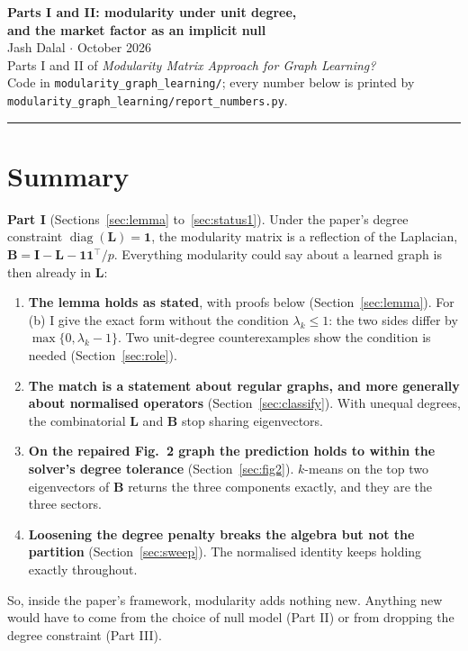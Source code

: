 \documentclass[11pt,a4paper]{article}
\newcommand{\Lap}{\mathbf{L}}
\newcommand{\Bmat}{\mathbf{B}}
\newcommand{\Imat}{\mathbf{I}}
\newcommand{\one}{\mathbf{1}}
\theoremstyle{remark}
\begin{document}
\begin{center}
{\Large\textbf{Parts I and II: modularity under unit degree,}}\\[1mm]
{\Large\textbf{and the market factor as an implicit null}}\\[2mm]
{\normalsize Jash Dalal \quad$\cdot$ October 2026}\\[1mm]
{\small Parts I and II of \emph{Modularity Matrix Approach for Graph Learning?}\\
Code in \texttt{modularity\_graph\_learning/}; every number below is printed by
\texttt{modularity\_graph\_learning/report\_numbers.py}.}
\end{center}
\vspace{2mm}
\hrule
\vspace{4mm}

\section{Summary}

\textbf{Part I} (Sections~\ref{sec:lemma} to~\ref{sec:status1}).
Under the paper's degree constraint $\operatorname{diag}(\Lap)=\one$, the modularity
matrix is a reflection of the Laplacian, $\Bmat=\Imat-\Lap-\one\one^\top/p$. Everything
modularity could say about a learned graph is then already in $\Lap$:
\begin{enumerate}
\item \textbf{The lemma holds as stated}, with proofs below (Section~\ref{sec:lemma}).
  For (b) I give the exact form without the condition $\lambda_k\le 1$: the two sides
  differ by $\max\{0,\lambda_k-1\}$. Two unit-degree counterexamples show the condition
  is needed (Section~\ref{sec:role}).
\item \textbf{The match is a statement about regular graphs, and more generally about
  normalised operators} (Section~\ref{sec:classify}). With unequal degrees, the
  combinatorial $\Lap$ and $\Bmat$ stop sharing eigenvectors.
\item \textbf{On the repaired Fig.~2 graph the prediction holds to within the solver's
  degree tolerance} (Section~\ref{sec:fig2}). $k$-means on the top two eigenvectors of
  $\Bmat$ returns the three components exactly, and they are the three sectors.
\item \textbf{Loosening the degree penalty breaks the algebra but not the partition}
  (Section~\ref{sec:sweep}). The normalised identity keeps holding exactly throughout.
\end{enumerate}
So, inside the paper's framework, modularity adds nothing new. Anything new would
have to come from the choice of null model (Part II) or from dropping the degree
constraint (Part III).
\end{document}

